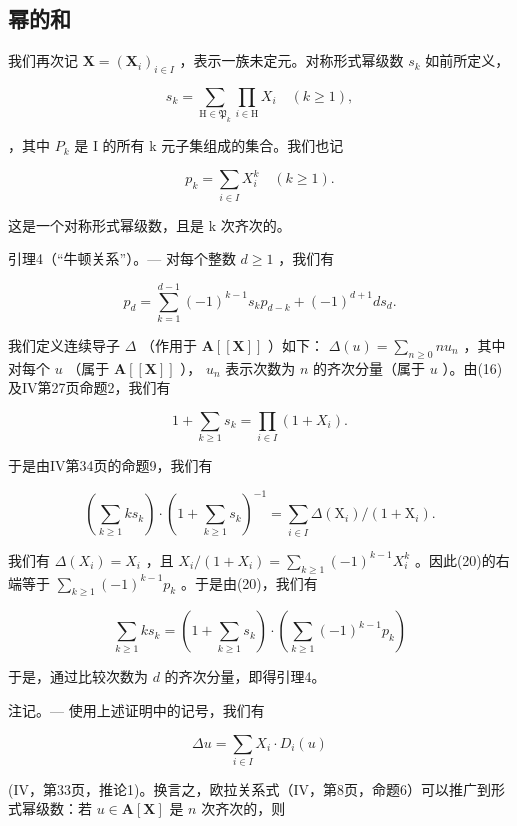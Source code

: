 \subsection{幂的和}

我们再次记 \(\mathbf{X} = (\mathbf{X}_{i})_{i \in I}\) ，表示一族未定元。对称形式幂级数 \(s_{k}\) 如前所定义，

\[
s _ {k} = \sum_ {\mathrm{H} \in \mathfrak {P} _ {k}} \prod_ {i \in \mathrm{H}} X _ {i} \quad (k \geqslant 1),\tag{16}
\]

，其中 \(P_{k}\) 是 I 的所有 k 元子集组成的集合。我们也记

\[
p _ {k} = \sum_ {i \in I} X _ {i} ^ {k} \quad (k \geqslant 1).\tag{17}
\]

这是一个对称形式幂级数，且是 k 次齐次的。

引理4（“牛顿关系”）。--- 对每个整数 \(d \geqslant 1\) ，我们有

\[
p _ {d} = \sum_ {k = 1} ^ {d - 1} (- 1) ^ {k - 1} s _ {k} p _ {d - k} + (- 1) ^ {d + 1} d s _ {d}.\tag{18}
\]

我们定义连续导子 \(\Delta\) （作用于 \(\mathbf{A}[[\mathbf{X}]]\) ）如下： \(\Delta(u) = \sum_{n \geq 0} nu_n\) ，其中对每个 \(u\) （属于 \(\mathbf{A}[[\mathbf{X}]]\) ）， \(u_n\) 表示次数为 \(n\) 的齐次分量（属于 \(u\) ）。由(16)及IV第27页命题2，我们有

\[
1 + \sum_ {k \geqslant 1} s _ {k} = \prod_ {i \in I} (1 + X _ {i}).\tag{19}
\]

于是由IV第34页的命题9，我们有

\[
\left(\sum_ {k \geqslant 1} k s _ {k}\right) \cdot \left(1 + \sum_ {k \geqslant 1} s _ {k}\right) ^ {- 1} = \sum_ {i \in I} \Delta \left(\mathrm{X} _ {i}\right) / \left(1 + \mathrm{X} _ {i}\right).\tag{20}
\]

我们有 \(\Delta(X_i) = X_i\) ，且 \(X_i / (1 + X_i) = \sum_{k \geq 1} (-1)^{k-1} X_i^k\) 。因此(20)的右端等于 \(\sum_{k \geq 1} (-1)^{k-1} p_k\) 。于是由(20)，我们有

\[
\sum_ {k \geqslant 1} k s _ {k} = \left(1 + \sum_ {k \geqslant 1} s _ {k}\right) \cdot \left(\sum_ {k \geqslant 1} (- 1) ^ {k - 1} p _ {k}\right)
\]

于是，通过比较次数为 \(d\) 的齐次分量，即得引理4。

注记。--- 使用上述证明中的记号，我们有

\[
\Delta u = \sum_ {i \in I} X _ {i} \cdot D _ {i} (u)
\]

(IV，第33页，推论1)。换言之，欧拉关系式（IV，第8页，命题6）可以推广到形式幂级数：若 \(u \in \mathbf{A}[\mathbf{X}]\) 是 \(n\) 次齐次的，则

